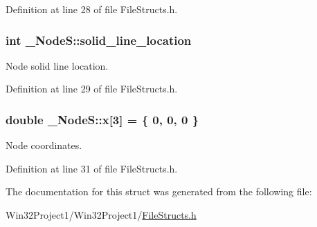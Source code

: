 Definition at line 28 of file File\+Structs.\+h.

\subsubsection[{\texorpdfstring{solid\+\_\+line\+\_\+location}{solid_line_location}}]{\setlength{\rightskip}{0pt plus 5cm}int \+\_\+\+Node\+S\+::solid\+\_\+line\+\_\+location}\hypertarget{struct___node_s_a486190cb5907d2695e87793dce313bbf}{}\label{struct___node_s_a486190cb5907d2695e87793dce313bbf}


Node solid line location. 



Definition at line 29 of file File\+Structs.\+h.

\subsubsection[{\texorpdfstring{x}{x}}]{\setlength{\rightskip}{0pt plus 5cm}double \+\_\+\+Node\+S\+::x\mbox{[}3\mbox{]} = \{ 0, 0, 0 \}}\hypertarget{struct___node_s_ab60b09e8b5b8009b574b9a0a49dd63fa}{}\label{struct___node_s_ab60b09e8b5b8009b574b9a0a49dd63fa}


Node coordinates. 



Definition at line 31 of file File\+Structs.\+h.



The documentation for this struct was generated from the following file\+:\begin{DoxyCompactItemize}
\item 
Win32\+Project1/\+Win32\+Project1/\hyperlink{_file_structs_8h}{File\+Structs.\+h}\end{DoxyCompactItemize}
